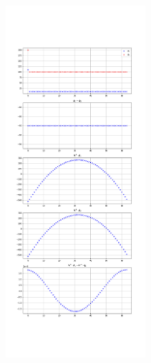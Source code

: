 \documentclass[a4paper]{article}
\begin{document}
\begin{figure}[h]
    \centering
    \includegraphics[width=200,keepaspectratio]{p2q1e_signals}
\end{figure}
\end{document}
